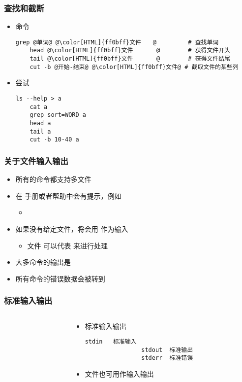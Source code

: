 \begin{CJK}{UTF8}{gbsn}
\begin{frame} [fragile]
	\frametitle{查找和截断}
	\linespread{1.25}
	\begin{itemize}
	\item 命令
	\begin{lstlisting}[style=bashstyle, gobble=4, texcl, escapechar=@]
	grep @单词@ @\color[HTML]{ff0bff}文件　　@		 # 查找单词
	head @\color[HTML]{ff0bff}文件　　　　@		 # 获得文件开头
	tail @\color[HTML]{ff0bff}文件　　　　@		 # 获得文件结尾
	cut -b @开始-结束@ @\color[HTML]{ff0bff}文件@	# 截取文件的某些列
	\end{lstlisting}
	\item 尝试
	\begin{lstlisting}[style=bashstyle, gobble=4, texcl, escapechar=@]
	ls --help > a
	cat a
	grep sort=WORD a
	head a
	tail a
	cut -b 10-40 a
	\end{lstlisting}
	\end{itemize}
\end{frame}

\begin{frame} [fragile]
	\frametitle{关于文件输入输出}
	\linespread{1.5}
	\begin{itemize}
	\item 所有的命令都支持多文件
	\item 在  手册或者帮助中会有提示，例如
		\begin{itemize}
		\item {}
		\end{itemize}
	\item 如果没有给定文件，将会用  作为输入
		\begin{itemize}
		\item 文件 \inlineBash{-} 可以代表  来进行处理
		\end{itemize}
	\item 大多命令的输出是 
	\item 所有命令的错误数据会被转到 
	\end{itemize}
\end{frame}

\begin{frame} [fragile]
	\frametitle{标准输入输出}
	\linespread{1.25}
	\begin{columns}[T]
		\begin{column}[T]{.5\textwidth}
			
		\end{column}
		\begin{column}[T]{.5\textwidth}
			\begin{itemize}
			\item 标准输入输出
				\begin{lstlisting}[style=bashstyle, gobble=16, texcl]
				stdin	标准输入
				stdout	标准输出
				stderr	标准错误
				\end{lstlisting}
			\item 文件也可用作输入输出
			\end{itemize}
		\end{column}
	\end{columns}
\end{frame}


\end{CJK}
